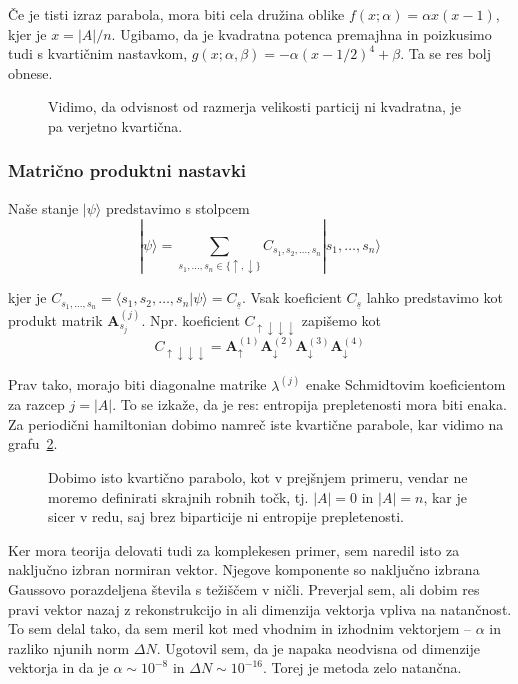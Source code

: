 \documentclass[12pt, a4paper]{article}
\newcommand{\A}{
	\ensuremath{\mathbf{A}}
}
\begin{document}
\v Ce je tisti izraz parabola, mora biti cela dru\v zina oblike $f(x;\alpha) = \alpha x(x-1)$, kjer je $x = |A|/n$. Ugibamo,
da je kvadratna potenca premajhna in poizkusimo tudi s kvarti\v cnim nastavkom, $g(x;\alpha,\beta) = -\alpha(x-1/2)^4 + \beta$.
Ta se res bolj obnese.

\begin{figure}[H]\centering
	
	\caption{Vidimo, da odvisnost od razmerja velikosti particij ni kvadratna, je pa verjetno kvarti\v cna.}
	\label{1-ni-parabola-a}
\end{figure}

\subsubsection{Matri\v cno produktni nastavki}

Na\v se stanje $|\psi\rangle$ predstavimo s stolpcem
\[
	|\psi\rangle = \sum_{s_1,\ldots,s_n \in \{\uparrow,\downarrow\}} C_{s_1,s_2,\ldots,s_n} |s_1,\ldots,s_n\rangle
\]

kjer je $C_{s_1,\ldots,s_n} = \langle s_1,s_2,\ldots,s_n|\psi\rangle = C_{\underline{s}}$. Vsak koeficient
$C_{\underline{s}}$ lahko predstavimo kot produkt matrik $\mathbf{A}^{(j)}_{s_j}$. Npr. koeficient
$C_{\uparrow\downarrow\downarrow\downarrow}$ zapi\v semo kot
\[
	C_{\uparrow\downarrow\downarrow\downarrow} = \A^{(1)}_\uparrow\A^{(2)}_\downarrow\A^{(3)}_\downarrow\A^{(4)}_\downarrow
\]

Prav tako, morajo biti diagonalne matrike $\lambda^{(j)}$ enake Schmidtovim koeficientom za razcep $j = |A|$. To se izka\v ze,
da je res: entropija prepletenosti mora biti enaka. Za periodi\v cni hamiltonian dobimo namre\v c iste kvarti\v cne parabole,
kar vidimo na grafu~\ref{2-periodicni-aji}.

\begin{figure}[H]\centering
	
	\caption{Dobimo isto kvarti\v cno parabolo, kot v prej\v snjem primeru, vendar ne moremo definirati skrajnih
		robnih to\v ck, tj. $|A| = 0$ in $|A| = n$, kar je sicer v redu, saj brez biparticije ni entropije
		prepletenosti.}
	\label{2-periodicni-aji}
\end{figure}

Ker mora teorija delovati tudi za komplekesen primer, sem naredil isto za  naklju\v cno izbran normiran vektor. Njegove
komponente so naklju\v cno izbrana Gaussovo porazdeljena \v stevila s te\v zi\v s\v cem v ni\v cli. Preverjal sem, ali
dobim res pravi vektor nazaj z rekonstrukcijo in ali dimenzija vektorja vpliva na natan\v cnost. To sem delal tako, da
sem meril kot med vhodnim in izhodnim vektorjem -- $\alpha$ in razliko njunih norm $\Delta N$. Ugotovil sem, da je napaka
neodvisna od dimenzije vektorja in da je $\alpha \sim 10^{-8}$ in $\Delta N \sim 10^{-16}$. Torej je metoda zelo natan\v cna.
\end{document}
